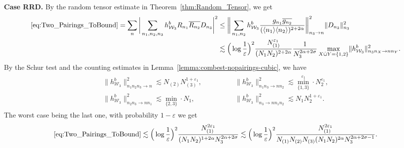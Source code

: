 \documentclass[11pt, xcolor = dvipsnames,reqno
]{amsart}
\theoremstyle{definition}
\theoremstyle{remark}
\begin{document}
\noindent
\textbf{Case RRD.} By the random tensor estimate in Theorem~\ref{thm:Random_Tensor}, we get
        \begin{align*}
        \eqref{eq:Two_Pairings_ToBound}
        = \sum_n \bigg| \sum_{n_1,n_2,n_3} h^b_{\mathcal{W}_3}    R_{n_1} \overline{R_{n_2}} D_{n_3} \bigg|^2   
        & \leq  \bigg\| \sum_{n_1,n_2} h^b_{\mathcal{W}_3} \frac{g_{n_1} \overline{g_{n_2}}}{(\langle n_1 \rangle \langle n_2 \rangle)^{2 + 2\alpha}} \bigg\|_{n_3 \rightarrow n}^2 \| D_{n_3} \|_{n_3}^2 \\
        & \lesssim \Big(  \log \frac{1}{\varepsilon} \Big)^2 \frac{N_{(1)}^{\varepsilon_1}}{(N_1 N_2)^{2 + 2\alpha} } \frac{1}{N_3^{2\alpha + 2\sigma}} \max_{X \dot\cup Y = \{1,2\}} \lVert h^b_{\mathcal{W}_3} \rVert_{n_3n_X \to nn_Y}^2.
        \end{align*}
        By the Schur test and the counting estimates in Lemma~\ref{lemma:combest-nopairings-cubic}, we have 
        \begin{align}\label{eq:schur-prob-3p}
            \begin{array}{ll}
               \lVert h^b_{\mathcal{W}_3} \rVert_{n_1n_2n_3 \to n}^2
            \lesssim N_{(2)} N_{(3)}^{1+\varepsilon_1},   & \qquad \qquad  \lVert h^b_{\mathcal{W}_3} \rVert_{n_1n_3 \to nn_2}^2 \lesssim  \operatorname{min}_{\{1,3\}}^{\varepsilon_1} \cdot N_2^{\varepsilon_1}, \\
              \lVert h^b_{\mathcal{W}_3} \rVert_{n_2n_3 \to nn_1}^2 \lesssim  \operatorname{min}_{\{2,3\}} \cdot N_1,   &  \qquad \qquad  \lVert h^b_{\mathcal{W}_3} \rVert_{n_3 \to nn_1n_2}^2 \lesssim N_1 N_2^{1+\varepsilon_1}.
            \end{array}
        \end{align}
        The worst case being the last one, with probability $1 - \varepsilon$ we get
        \begin{align*}
            \eqref{eq:Two_Pairings_ToBound}
            \lesssim \Big(\log \frac{1}{\varepsilon} \Big)^2 \frac{N_{(1)}^{2\varepsilon_1}}{(N_1N_2)^{1 + 2\alpha} N_3^{2\alpha + 2\sigma}}
            \lesssim \Big(\log \frac{1}{\varepsilon} \Big)^2 \frac{N_{(1)}^{2\varepsilon_1}}{N_{(1)}N_{(2)}N_{(3)}(N_1N_2)^{2\alpha} N_3^{2\alpha + 2\sigma - 1}}. 
        \end{align*}
\end{document}
